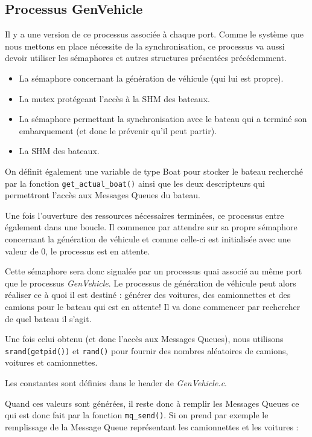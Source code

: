 \documentclass[a4paper, 11pt]{article}
\begin{document}
		
	\subsection{Processus GenVehicle}
		Il y a une version de ce processus associée à chaque port. Comme le système que nous mettons en place nécessite de la synchronisation, ce processus va aussi devoir utiliser les sémaphores et autres structures présentées précédemment.
		\begin{itemize}
			\item La sémaphore concernant la génération de véhicule (qui lui est propre).
			\item La mutex protégeant l'accès à la SHM des bateaux.
			\item La sémaphore permettant la synchronisation avec le bateau qui a terminé son embarquement (et donc le prévenir qu'il peut partir).
			\item La SHM des bateaux.
		\end{itemize}
		On définit également une variable de type Boat pour stocker le bateau recherché par la fonction \texttt{get\_actual\_boat()} ainsi que les deux descripteurs qui permettront l'accès aux Messages Queues du bateau.
		
		Une fois l'ouverture des ressources nécessaires terminées, ce processus entre également dans une boucle. Il commence par attendre sur sa propre sémaphore concernant la génération de véhicule et comme celle-ci est initialisée avec une valeur de 0, le processus est en attente. 
		
		Cette sémaphore sera donc signalée par un processus quai associé au même port que le processus \textit{GenVehicle}. Le processus de génération de véhicule peut alors réaliser ce à quoi il est destiné : générer des voitures, des camionnettes et des camions pour le bateau qui est en attente! Il va donc commencer par rechercher de quel bateau il s'agit. 
		
		Une fois celui obtenu (et donc l'accès aux Messages Queues), nous utilisons \texttt{srand(getpid())} et \texttt{rand()} pour fournir des nombres aléatoires de camions, voitures et camionnettes.
		
		Les constantes sont définies dans le header de \textit{GenVehicle.c}.
		
		Quand ces valeurs sont générées, il reste donc à remplir les Messages Queues ce qui est donc fait par la fonction \texttt{mq\_send()}. Si on prend par exemple le remplissage de la Message Queue représentant les camionnettes et les voitures :
\end{document}
